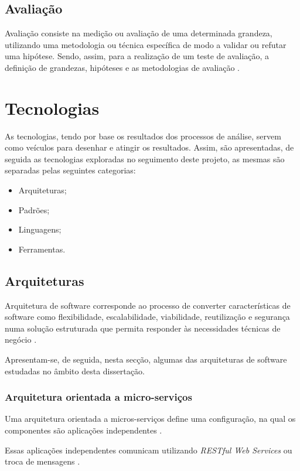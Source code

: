 \subsection{Avaliação \label{estado_arte_avaliacao}}
Avaliação consiste na medição ou avaliação de uma determinada grandeza, utilizando uma metodologia ou técnica específica de modo a validar ou refutar uma hipótese. Sendo, assim, para a realização de um teste de avaliação, a definição de grandezas, hipóteses e as metodologias de avaliação \cite{experimentation_principles}.

\section{Tecnologias\label{section_tecnologias}}
As tecnologias, tendo por base os resultados dos processos de análise, servem como veículos para desenhar e atingir os resultados. Assim, são apresentadas, de seguida as tecnologias exploradas no seguimento deste projeto, as mesmas são separadas pelas seguintes categorias:
\begin{itemize}
    \item Arquiteturas;
    \item Padrões;
    \item Linguagens;
    \item Ferramentas.
\end{itemize}

\subsection{Arquiteturas}
Arquitetura de software corresponde ao processo de converter características de software como flexibilidade, escalabilidade, viabilidade, reutilização e segurança numa solução estruturada que permita responder às necessidades técnicas de negócio \cite{software_architecture}.

Apresentam-se, de seguida, nesta secção, algumas das arquiteturas de software estudadas no âmbito desta dissertação.

\subsubsection{Arquitetura orientada a micro-serviços}

Uma arquitetura orientada a micros-serviços define uma configuração, na qual os componentes são aplicações independentes \cite{microservices_flexible_software_architecture}.

Essas aplicações independentes comunicam utilizando \emph{RESTful Web Services} ou troca de mensagens \cite{building_microservices:2015}.

